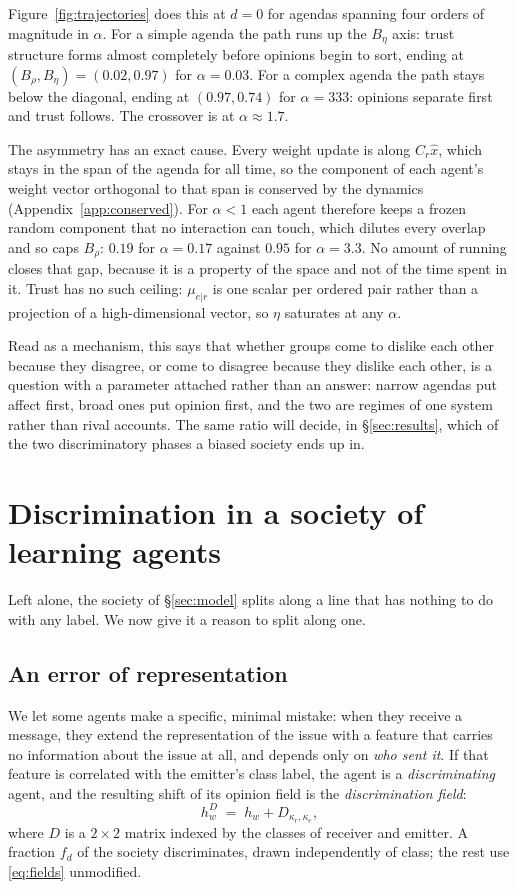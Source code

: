 \documentclass{article}
\newcommand{\hw}{h_{w}}
\newcommand{\Brho}{B_{\rho}}
\newcommand{\Beta}{B_{\eta}}
\newcommand{\fd}{f_{d}}
\begin{document}
Figure~\ref{fig:trajectories} does this at $d=0$ for agendas spanning four orders of
magnitude in $\alpha$. For a simple agenda the path runs up the $\Beta$ axis: trust
structure forms almost completely before opinions begin to sort, ending at
$(\Brho,\Beta)=(0.02,0.97)$ for $\alpha=0.03$. For a complex agenda the path stays below
the diagonal, ending at $(0.97,0.74)$ for $\alpha=333$: opinions separate first and
trust follows. The crossover is at $\alpha\approx1.7$.

The asymmetry has an exact cause. Every weight update is along $C_r\hat{x}$, which
stays in the span of the agenda for all time, so the component of each agent's
weight vector orthogonal to that span is conserved by the dynamics
(Appendix~\ref{app:conserved}). For $\alpha<1$ each agent therefore keeps a frozen
random component that no interaction can touch, which dilutes every overlap and so caps $\Brho$: $0.19$ for $\alpha=0.17$ against $0.95$ for $\alpha=3.3$. No
amount of running closes that gap, because it is a property of the space and not of
the time spent in it.
Trust has no such ceiling: $\mu_{e|r}$ is one scalar per ordered pair rather than a
projection of a high-dimensional vector, so $\eta$ saturates at any $\alpha$.

Read as a mechanism, this says that whether groups come to dislike each other
because they disagree, or come to disagree because they dislike each other, is a
question with a parameter attached rather than an answer: narrow agendas put affect
first, broad ones put opinion first, and the two are regimes of one system rather
than rival accounts. The same ratio will decide, in \S\ref{sec:results}, which of the
two discriminatory phases a biased society ends up in.

\section{Discrimination in a society of learning agents}
\label{sec:discrimination}

Left alone, the society of \S\ref{sec:model} splits along a line that has nothing to
do with any label. We now give it a reason to split along one.

\subsection{An error of representation}
\label{sec:error}

We let some agents make a specific, minimal mistake: when they receive a message, they extend the
representation of the issue with a feature that carries no information about the
issue at all, and depends only on \emph{who sent it}. If that feature is
correlated with the emitter's class label, the agent is a
\emph{discriminating} agent, and the resulting shift of its opinion field is the
\emph{discrimination field}:
%
\begin{equation}
  \hw^{D} \;=\; \hw + D_{\kappa_r,\kappa_e},
  \label{eq:disc-field}
\end{equation}
%
where $D$ is a $2\times2$ matrix indexed by the classes of receiver and emitter.
A fraction $\fd$ of the society discriminates, drawn independently of class; the
rest use \eqref{eq:fields} unmodified.
\end{document}
